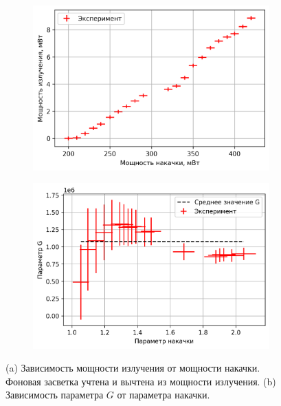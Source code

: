 \documentclass[12pt]{article}
\begin{document}
	\begin{figure} 
    	\centering
    	\begin{subfigure}[tb]{.49\textwidth}
			\centering
		 	\includegraphics[width=\textwidth]{../figures/p_iz_vs_p_nak.png}
			\caption{}
			\label{fig:p_iz_vs_p_nak}
		\end{subfigure}
    	\hfill
    	\begin{subfigure}[tb]{.49\textwidth}
			\centering
			\includegraphics[width=\textwidth]{../figures/g_vs_a.png}
			\caption{}
			\label{fig:g_vs_a}
		\end{subfigure}
     	\caption{(a) Зависимость мощности излучения от мощности накачки. Фоновая засветка учтена и вычтена из мощности излучения. (b) Зависимость параметра $G$ от параметра накачки.}
	\end{figure}
\end{document}
